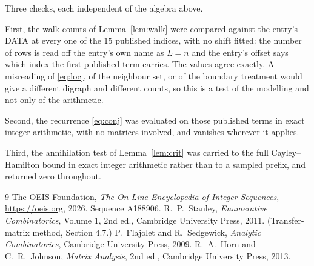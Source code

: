 \documentclass[11pt,a4paper]{article}
\theoremstyle{plain}
\theoremstyle{definition}
\begin{document}
Three checks, each independent of the algebra above.

First, the walk counts of Lemma~\ref{lem:walk} were compared against the entry's DATA at
every one of the $15$ published indices, with no shift fitted: the number of rows is
read off the entry's own name as $L=n$ and the entry's offset says which index the first
published term carries. The values agree exactly. A misreading of \eqref{eq:loc}, of the
neighbour set, or of the boundary treatment would give a different digraph and different
counts, so this is a test of the modelling and not only of the arithmetic.

Second, the recurrence \eqref{eq:conj} was evaluated on those published terms in exact
integer arithmetic, with no matrices involved, and vanishes wherever it applies.

Third, the annihilation test of Lemma~\ref{lem:crit} was carried to the full
Cayley--Hamilton bound in exact integer arithmetic rather than to a sampled prefix, and
returned zero throughout.

\begin{thebibliography}{9}
 The OEIS Foundation, \emph{The On-Line Encyclopedia of Integer
Sequences}, \url{https://oeis.org}, 2026. Sequence A188906.
 R.~P.~Stanley, \emph{Enumerative Combinatorics}, Volume 1, 2nd ed.,
Cambridge University Press, 2011. (Transfer-matrix method, Section 4.7.)
 P.~Flajolet and R.~Sedgewick, \emph{Analytic Combinatorics}, Cambridge
University Press, 2009.
 R.~A.~Horn and C.~R.~Johnson, \emph{Matrix Analysis}, 2nd ed., Cambridge
University Press, 2013.
\end{thebibliography}
\end{document}
